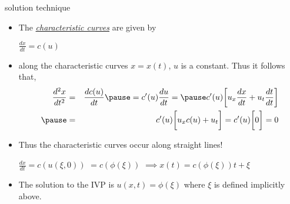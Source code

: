 \documentclass[t,10pt,fleqn]{beamer}
\def\ds{\displaystyle}
\def\[{\biggr [ }
\def\]{\biggr ] }
\newcommand{\tu}[1]{\underline{\textit{#1}}}
\begin{document}
\begin{frame}
\pause
\begin{block}{solution technique}

       \begin{itemize}
       \pause
       \item The \tu{characteristic curves} are given by 
                \begin{center}
          $\ds \frac{ dx }{dt} = c(u)$
        \end{center}
       \pause
       \item along the characteristic curves $x=x(t)$, $u$ is a constant.  Thus it follows that,
         \begin{eqnarray*}
             \ds    \frac{ d^2x }{dt^2}   & = &    \frac{ d c(u )}{dt}          \pause
                        =  c'(u) \frac{ du}{dt}   =  \pause     
                        c'(u) \[ u_x  \frac{ dx }{dt}  + u_t  \frac{ dt }{dt}  \]   \\   \pause
                     &=  &c'(u) \[ u_x  c(u)  + u_t \] = c'(u) \[ 0 \] =0 
        \end{eqnarray*}
       \pause
       \item Thus the characteristic curves occur along straight lines!
                \begin{center}
          $\ds \frac{ dx }{dt} = c(u(\xi,0)) $ \pause
                                      $ =c(\phi(\xi))$ \pause
                                     $ \implies x(t) = c(\phi(\xi)) t + \xi $
               \end{center}
               \pause
       \item The solution to the IVP is $u(x,t) = \phi(\xi)$ where $\xi$ is defined implicitly above.
       
       \end{itemize}
       
\end{block}


\end{frame}
\end{document}
